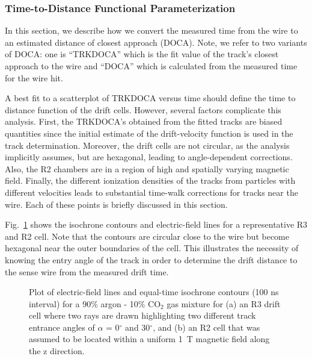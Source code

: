 \subsubsection{Time-to-Distance Functional Parameterization}
\label{tdistcal}
In this section, we describe how we convert the measured time from
the wire to an estimated distance of closest approach (DOCA).
Note, we refer to two variants of DOCA: one is ``TRKDOCA'' which is the
fit value of the track's closest approach to the wire and ``DOCA''
which is calculated from the measured time for the wire hit.
 
A best fit to a scatterplot of TRKDOCA versus time should define the time to
distance function of the drift cells. However, several factors 
complicate this analysis.  First, the TRKDOCA's obtained from the fitted 
tracks are biased quantities since the initial estimate of the drift-velocity function 
is used in the track determination.  Moreover, the drift cells are 
not circular, as the analysis implicitly assumes, but are hexagonal, leading 
to angle-dependent corrections.   Also, the R2 chambers are in a 
region of high and spatially varying magnetic field.  Finally, the different 
ionization densities of the tracks from particles with different velocities 
leads to substantial time-walk corrections for tracks near the wire.  Each of 
these points is briefly discussed in this section.

Fig.~\ref{garfield-isochrones} shows the isochrone contours and electric-field lines for 
a representative R3 and R2 cell.  Note that the contours are circular close 
to the wire but become hexagonal near the outer boundaries of the cell.  This 
illustrates the necessity of knowing the entry angle of the track in order to 
determine the drift distance to the sense wire from the measured drift time.

\begin{figure}[htpb]
\vspace{8cm} 
\caption{\small{Plot of electric-field lines and equal-time isochrone contours
(100 ns interval) for a 90$\%$ argon - 10$\%$ CO$_2$ gas mixture for (a) an R3
drift cell where two rays are drawn highlighting two different track entrance 
angles of $\alpha$ = 0$^{\circ}$ and 30$^{\circ}$, and (b) an R2 cell that 
was assumed to be located within a uniform 1~T magnetic field along the z 
direction.}}
\label{garfield-isochrones}
\end{figure}

